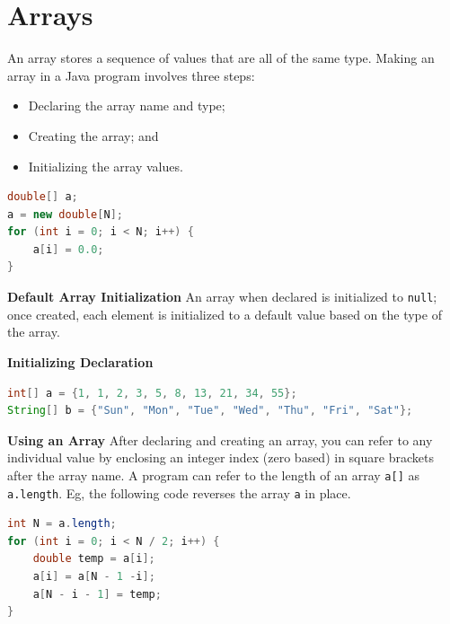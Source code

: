 \documentclass[8pt,a4paper,compress]{beamer}
\begin{document}
\section{Arrays}
\begin{frame}[fragile]
\pause

An array stores a sequence of values that are all of the same type. Making an array in a Java program involves three steps:
\begin{itemize}
\item Declaring the array name and type; 
\item Creating the array; and
\item Initializing the array values.
\end{itemize}
\begin{lstlisting}[language=Java]
double[] a;
a = new double[N];
for (int i = 0; i < N; i++) {
    a[i] = 0.0;
}
\end{lstlisting}

\pause
\smallskip
\textbf{Default Array Initialization} An array when declared is initialized to \lstinline$null$; once created, each element is initialized to a default value based on the type of the array.

\pause
\smallskip
\textbf{Initializing Declaration}
\begin{lstlisting}[language=Java]
int[] a = {1, 1, 2, 3, 5, 8, 13, 21, 34, 55};
String[] b = {"Sun", "Mon", "Tue", "Wed", "Thu", "Fri", "Sat"};
\end{lstlisting}

\pause
\smallskip
\textbf{Using an Array} After declaring and creating an array, you can refer to any individual value by enclosing an integer index (zero based) in square brackets after the array name. A program can refer to the length of an array \lstinline$a[]$ as \lstinline$a.length$. Eg, the following code reverses the array \lstinline$a$ in place.
\begin{lstlisting}[language=Java]
int N = a.length;
for (int i = 0; i < N / 2; i++) {
    double temp = a[i];
    a[i] = a[N - 1 -i];
    a[N - i - 1] = temp;
}
\end{lstlisting}
\end{frame}
\end{document}
